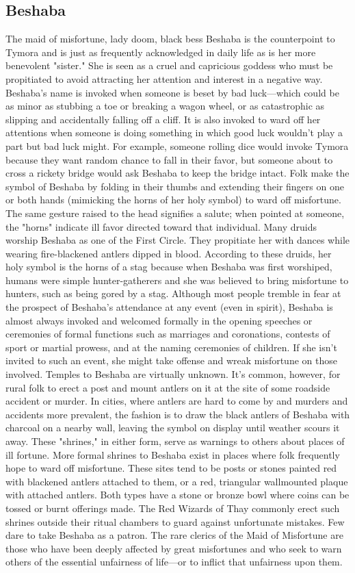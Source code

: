 \documentclass[10pt,a4paper,twoside,twocolumn,openany,bg=print,nodeprecatedcode]{dndbook}
\begin{document}
\subsection{Beshaba}
The maid of misfortune, lady doom, black bess
Beshaba is the counterpoint to Tymora and is just as frequently acknowledged in daily life as is her more benevolent "sister." She is seen as a cruel and capricious goddess who must be propitiated to avoid attracting her attention and interest in a negative way.
Beshaba's name is invoked when someone is beset by bad luck—which could be as minor as stubbing a toe or breaking a wagon wheel, or as catastrophic as slipping and accidentally falling off a cliff. It is also invoked to ward off her attentions when someone is doing something in which good luck wouldn't play a part but bad luck might. For example, someone rolling dice would invoke Tymora because they want random chance to fall in their favor, but someone about to cross a rickety bridge would ask Beshaba to keep the bridge intact.
Folk make the symbol of Beshaba by folding in their thumbs and extending their fingers on one or both hands (mimicking the horns of her holy symbol) to ward off misfortune. The same gesture raised to the head signifies a salute; when pointed at someone, the "horns" indicate ill favor directed toward that individual.
Many druids worship Beshaba as one of the First Circle. They propitiate her with dances while wearing fire-blackened antlers dipped in blood. According to these druids, her holy symbol is the horns of a stag because when Beshaba was first worshiped, humans were simple hunter-gatherers and she was believed to bring misfortune to hunters, such as being gored by a stag.
Although most people tremble in fear at the prospect of Beshaba's attendance at any event (even in spirit), Beshaba is almost always invoked and welcomed formally in the opening speeches or ceremonies of formal functions such as marriages and coronations, contests of sport or martial prowess, and at the naming ceremonies of children. If she isn't invited to such an event, she might take offense and wreak misfortune on those involved.
Temples to Beshaba are virtually unknown. It's common, however, for rural folk to erect a post and mount antlers on it at the site of some roadside accident or murder. In cities, where antlers are hard to come by and murders and accidents more prevalent, the fashion is to draw the black antlers of Beshaba with charcoal on a nearby wall, leaving the symbol on display until weather scours it away. These "shrines," in either form, serve as warnings to others about places of ill fortune.
More formal shrines to Beshaba exist in places where folk frequently hope to ward off misfortune. These sites tend to be posts or stones painted red with blackened antlers attached to them, or a red, triangular wallmounted plaque with attached antlers. Both types have a stone or bronze bowl where coins can be tossed or burnt offerings made. The Red Wizards of Thay commonly erect such shrines outside their ritual chambers to guard against unfortunate mistakes.
Few dare to take Beshaba as a patron. The rare clerics of the Maid of Misfortune are those who have been deeply affected by great misfortunes and who seek to warn others of the essential unfairness of life—or to inflict that unfairness upon them.
\end{document}
